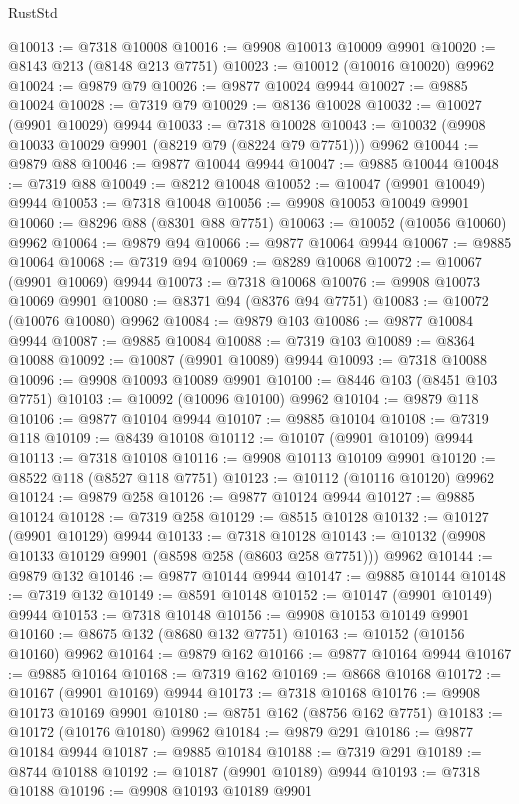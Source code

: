 \begin{lexlean}{RustStd}
\begin{coremodule}
@10013 := @7318 @10008
@10016 := @9908 @10013 @10009 @9901
@10020 := @8143 @213 (@8148 @213 @7751)
@10023 := @10012 (@10016 @10020) @9962
@10024 := @9879 @79
@10026 := @9877 @10024 @9944
@10027 := @9885 @10024
@10028 := @7319 @79
@10029 := @8136 @10028
@10032 := @10027 (@9901 @10029) @9944
@10033 := @7318 @10028
@10043 := @10032 (@9908 @10033 @10029 @9901 (@8219 @79 (@8224 @79 @7751))) @9962
@10044 := @9879 @88
@10046 := @9877 @10044 @9944
@10047 := @9885 @10044
@10048 := @7319 @88
@10049 := @8212 @10048
@10052 := @10047 (@9901 @10049) @9944
@10053 := @7318 @10048
@10056 := @9908 @10053 @10049 @9901
@10060 := @8296 @88 (@8301 @88 @7751)
@10063 := @10052 (@10056 @10060) @9962
@10064 := @9879 @94
@10066 := @9877 @10064 @9944
@10067 := @9885 @10064
@10068 := @7319 @94
@10069 := @8289 @10068
@10072 := @10067 (@9901 @10069) @9944
@10073 := @7318 @10068
@10076 := @9908 @10073 @10069 @9901
@10080 := @8371 @94 (@8376 @94 @7751)
@10083 := @10072 (@10076 @10080) @9962
@10084 := @9879 @103
@10086 := @9877 @10084 @9944
@10087 := @9885 @10084
@10088 := @7319 @103
@10089 := @8364 @10088
@10092 := @10087 (@9901 @10089) @9944
@10093 := @7318 @10088
@10096 := @9908 @10093 @10089 @9901
@10100 := @8446 @103 (@8451 @103 @7751)
@10103 := @10092 (@10096 @10100) @9962
@10104 := @9879 @118
@10106 := @9877 @10104 @9944
@10107 := @9885 @10104
@10108 := @7319 @118
@10109 := @8439 @10108
@10112 := @10107 (@9901 @10109) @9944
@10113 := @7318 @10108
@10116 := @9908 @10113 @10109 @9901
@10120 := @8522 @118 (@8527 @118 @7751)
@10123 := @10112 (@10116 @10120) @9962
@10124 := @9879 @258
@10126 := @9877 @10124 @9944
@10127 := @9885 @10124
@10128 := @7319 @258
@10129 := @8515 @10128
@10132 := @10127 (@9901 @10129) @9944
@10133 := @7318 @10128
@10143 := @10132 (@9908 @10133 @10129 @9901 (@8598 @258 (@8603 @258 @7751))) @9962
@10144 := @9879 @132
@10146 := @9877 @10144 @9944
@10147 := @9885 @10144
@10148 := @7319 @132
@10149 := @8591 @10148
@10152 := @10147 (@9901 @10149) @9944
@10153 := @7318 @10148
@10156 := @9908 @10153 @10149 @9901
@10160 := @8675 @132 (@8680 @132 @7751)
@10163 := @10152 (@10156 @10160) @9962
@10164 := @9879 @162
@10166 := @9877 @10164 @9944
@10167 := @9885 @10164
@10168 := @7319 @162
@10169 := @8668 @10168
@10172 := @10167 (@9901 @10169) @9944
@10173 := @7318 @10168
@10176 := @9908 @10173 @10169 @9901
@10180 := @8751 @162 (@8756 @162 @7751)
@10183 := @10172 (@10176 @10180) @9962
@10184 := @9879 @291
@10186 := @9877 @10184 @9944
@10187 := @9885 @10184
@10188 := @7319 @291
@10189 := @8744 @10188
@10192 := @10187 (@9901 @10189) @9944
@10193 := @7318 @10188
@10196 := @9908 @10193 @10189 @9901

\end{coremodule}
\end{lexlean}
